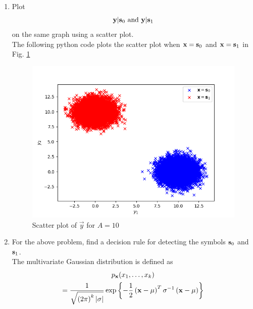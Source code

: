 \documentclass[10pt, a4paper]{article}
\providecommand{\brak}[1]{\ensuremath{\left(#1\right)}}
\begin{document}
    \begin{enumerate}
    \item
    Plot 
    \begin{equation}
    \mathbf{y}|\mathbf{s}_0 \text{ and } \mathbf{y}|\mathbf{s}_1
    \end{equation}
    on the same graph using a scatter plot.\\
    \solution The following python code plots the scatter plot when $\mathbf{x} = \mathbf{s}_0$ and $\mathbf{x} = \mathbf{s}_1$ in Fig. \ref{fig:scatter_plt_y}
\begin{center}
\end{center}
    \begin{figure}
    \centering
    \includegraphics[width=\columnwidth]{images/scatter_plot.png}
    \caption{Scatter plot of $\vec{y}$ for $A = 10$}
    \label{fig:scatter_plt_y}
    \end{figure}
    \item
    For the above problem, find a decision rule for detecting the symbols $\mathbf{s}_0 $ and $\mathbf{s}_1$.
    \\
   \solution The multivariate Gaussian distribution is defined as
    \begin{multline}
    \label{eq:multivariate}
    p_{\mathbf{x}}(x_1,\dots,x_k)
    \\
    =\frac{1}{\sqrt{\brak{2\pi}^k\abs{\mbf{\sigma}}}}\exp\cbrak{-\frac{1}{2}\brak{\mathbf{x}-\mbf{\mu}}^T\mbf{\sigma}^{-1}\brak{\mathbf{x}-\mbf{\mu}}}

\end{multline}
\end{enumerate}
\end{document}
